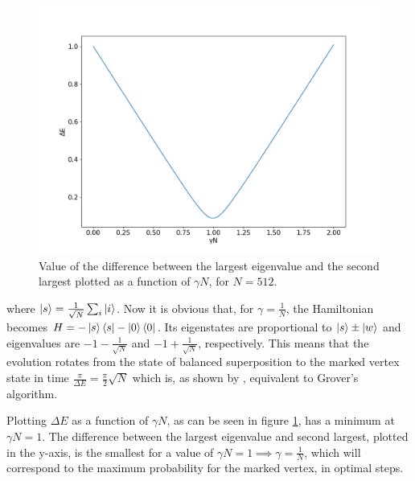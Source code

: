 \documentclass[../../dissertation.tex]{subfiles}
\begin{document}
\begin{figure}[h]
	\centering \includegraphics[scale=0.40]{img/ContQuantumWalk/Search/gamma512.png}
	\caption{Value of the difference between the largest eigenvalue and the second largest plotted as a function of $\gamma N$, for $N=512$.}
	\label{fig:gamma512}
\end{figure}
where $\ket{s} = \frac{1}{\sqrt{N}}\sum_i \ket{i}$. Now it is obvious that, for
$\gamma = \frac{1}{N}$, the Hamiltonian becomes $H = -\ket{s}\bra{s} -
\ket{0}\bra{0}$. Its eigenstates are proportional to $\ket{s}\pm\ket{w}$ and
eigenvalues are $-1 - \frac{1}{\sqrt{N}}$ and $-1 + \frac{1}{\sqrt{N}}$,
respectively. This means that the evolution rotates from the state of balanced
superposition to the marked vertex state in time $\frac{\pi}{\Delta E} =
\frac{\pi}{2}\sqrt{N}$ which is, as shown by \cite{farhi2000}, equivalent to
Grover's algorithm.\par

Plotting $\Delta E$ as a function of $\gamma N$, as can be seen in figure
\ref{fig:gamma512}, has a minimum at $\gamma N =1$. The difference between the
largest eigenvalue and second largest, plotted in the y-axis, is the smallest
for a value of $\gamma N = 1 \implies \gamma =\frac{1}{N}$, which will
correspond to the maximum probability for the marked vertex, in optimal steps.\par
\end{document}
